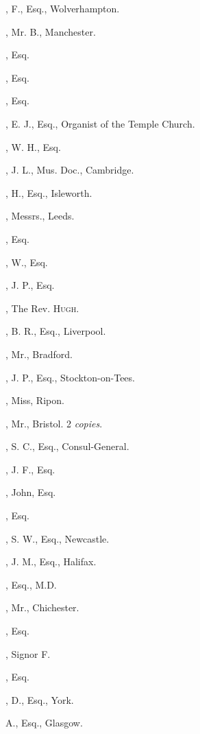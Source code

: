 \begin{multicols}{2}
, F., Esq., Wolverhampton.

, Mr. B., Manchester.

, Esq.

, Esq.

, Esq.

, E. J., Esq., Organist of the
Temple Church.

, W. H., Esq.

, J. L., Mus. Doc., Cambridge.

, H., Esq., Isleworth.

, Messrs., Leeds.

, Esq.

, W., Esq.

, J. P., Esq.

, The Rev. \textsc{Hugh}.
\bigskip

, B. R., Esq., Liverpool.
\bigskip

, Mr., Bradford.

, J. P., Esq., Stockton-on-Tees.
\bigskip

, Miss, Ripon.

, Mr., Bristol. 2 \textit{copies}.

, S. C., Esq., Consul-General.
\pagebreak

, J. F., Esq.

, John, Esq.

, Esq.

, S. W., Esq., Newcastle.

, J. M., Esq., Halifax.

, Esq., M.D.

, Mr., Chichester.

, Esq.
\bigskip

, Signor F.

, Esq.

, D., Esq., York.

 A., Esq., Glasgow.


\end{multicols}
